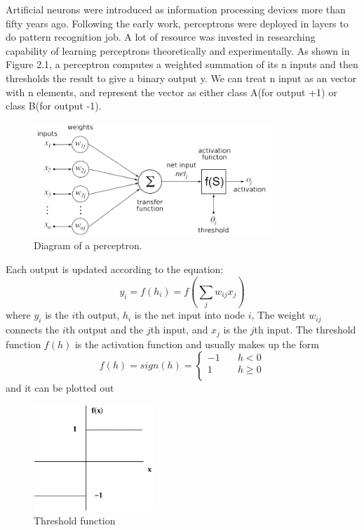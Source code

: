 Artificial neurons were introduced as information processing devices more than fifty years ago\citep{mcculloch1943logical}. Following the early work, perceptrons were deployed in layers to do pattern recognition job. A lot of resource was invested in researching capability of learning perceptrons theoretically and experimentally. As shown in Figure 2.1, a perceptron computes a weighted summation of its n inputs and then thresholds the result to give a binary output y. We can treat n input as an vector with n elements, and represent the vector as either class A(for output +1) or class B(for output -1).
\graphicspath{ {./Figures/} }
\begin{figure}[!htb]
\centering
\includegraphics[width=0.8\textwidth]{Figure2-1.png}
\caption{\label{fig:perceptron}Diagram of a perceptron.}
\end{figure}

Each output is updated according to the equation:
\begin{equation}\label{eq:BasicEq}
y_{i} = f(h_{i}) = f\left(\sum_{j}w_{ij}x_{j}\right)
\end{equation}
where $y_{i}$ is the $i$th output, $h_{i}$ is the net input into node $i$, The weight $w_{ij}$ connects the $i$th output and the $j$th input, and $x_{j}$ is the $j$th input. The threshold function $f(h)$ is the activation function and usually makes up the form
\begin{equation}\label{eq:FullEq}
f(h) = sign(h) = 
  \begin{cases}
    -1       & \quad h < 0 \\
    1  & \quad h \geq 0\\
  \end{cases}
\end{equation}
and it can be plotted out
\graphicspath{ {./Figures/} }
\begin{figure}[!htb]
\centering
\includegraphics[width=0.4\textwidth]{bipolar-threshold.jpg}
\caption{\label{fig:1LayerErrorSurface}Threshold function}
\end{figure}

